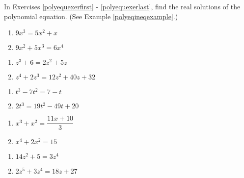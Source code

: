 \documentclass{ximera}
\begin{document}
In Exercises \ref{polyequexerfirst} - \ref{polyequexerlast}, find the real solutions of the polynomial equation.  (See Example \ref{polyeqineqexample}.)

\begin{multicols}{2}
\begin{enumerate}
\setcounter{enumi}{\value{HW}}

\item  $9x^{3} = 5x^{2} + x$  \label{polyequexerfirst} 
\item $9x^{2}+5x^{3}= 6x^{4}$  

\setcounter{HW}{\value{enumi}}
\end{enumerate}
\end{multicols}

\begin{multicols}{2}
\begin{enumerate}
\setcounter{enumi}{\value{HW}}

\item $z^{3} + 6 = 2z^{2} + 5z$ 
\item $z^{4} + 2z^{3} = 12z^{2} + 40z + 32$ 

\setcounter{HW}{\value{enumi}}
\end{enumerate}
\end{multicols}


\begin{multicols}{2}
\begin{enumerate}
\setcounter{enumi}{\value{HW}}

\item $t^{3} - 7t^{2} = 7-t$ 
\item $2t^{3} = 19t^{2} - 49t + 20$ 

\setcounter{HW}{\value{enumi}}
\end{enumerate}
\end{multicols}

\begin{multicols}{2}
\begin{enumerate}
\setcounter{enumi}{\value{HW}}

\item $x^{3} + x^{2} = \dfrac{11x + 10}{3}$ 
\item $x^4+2x^2 = 15$ 


\setcounter{HW}{\value{enumi}}
\end{enumerate}
\end{multicols}

\begin{multicols}{2}
\begin{enumerate}
\setcounter{enumi}{\value{HW}}

\item $14z^{2}+5=3z^{4}$  

\item $2z^5+3z^4 = 18z + 27$ \label{polyequexerlast}  

\setcounter{HW}{\value{enumi}}
\end{enumerate}
\end{multicols}
\end{document}
